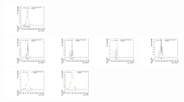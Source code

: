 \begin{figure}[htpb]
  \includegraphics[width=0.2\textwidth]{fig/analysisAppendix/templateVsReco_ZprToWW2000_r0_MVV_mu_LP_nobb_HDy_linear.pdf}\\
  \includegraphics[width=0.2\textwidth]{fig/analysisAppendix/templateVsReco_ZprToWW2000_r0_MVV_mu_HP_vbf_LDy_linear.pdf}
  \includegraphics[width=0.2\textwidth]{fig/analysisAppendix/templateVsReco_ZprToWW2000_r0_MVV_mu_LP_vbf_LDy_linear.pdf}
  \includegraphics[width=0.2\textwidth]{fig/analysisAppendix/templateVsReco_ZprToWW2000_r0_MVV_mu_HP_vbf_HDy_linear.pdf}
  \includegraphics[width=0.2\textwidth]{fig/analysisAppendix/templateVsReco_ZprToWW2000_r0_MVV_mu_LP_vbf_HDy_linear.pdf}\\
  \includegraphics[width=0.2\textwidth]{fig/analysisAppendix/templateVsReco_ZprToWW2000_r0_MJ_mu_HP_bb_LDy.pdf}
  \includegraphics[width=0.2\textwidth]{fig/analysisAppendix/templateVsReco_ZprToWW2000_r0_MJ_mu_LP_bb_LDy.pdf}

\end{figure}
